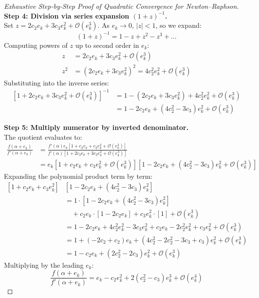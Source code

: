 \begin{proof}[Exhaustive Step-by-Step Proof of Quadratic Convergence for Newton--Raphson]
\noindent\textbf{Step 4: Division via series expansion $(1 + z)^{-1}$.} \\
Set $z = 2 c_2 e_k + 3 c_3 e_k^2 + \mathcal{O}(e_k^3)$. As $e_k \to 0$, $|z| < 1$, so we expand:
\begin{equation}
    (1 + z)^{-1} = 1 - z + z^2 - z^3 + \dots
\end{equation}
Computing powers of $z$ up to second order in $e_k$:
\begin{align}
    z &= 2 c_2 e_k + 3 c_3 e_k^2 + \mathcal{O}(e_k^3) \\
    z^2 &= \left( 2 c_2 e_k + 3 c_3 e_k^2 \right)^2 = 4 c_2^2 e_k^2 + \mathcal{O}(e_k^3)
\end{align}
Substituting into the inverse series:
\begin{align}
    \left[ 1 + 2 c_2 e_k + 3 c_3 e_k^2 + \mathcal{O}(e_k^3) \right]^{-1} &= 1 - \left( 2 c_2 e_k + 3 c_3 e_k^2 \right) + 4 c_2^2 e_k^2 + \mathcal{O}(e_k^3) \nonumber \\
    &= 1 - 2 c_2 e_k + (4 c_2^2 - 3 c_3) e_k^2 + \mathcal{O}(e_k^3)
\end{align}

\noindent\textbf{Step 5: Multiply numerator by inverted denominator.} \\
The quotient evaluates to:
\begin{align}
    \frac{f(\alpha + e_k)}{f'(\alpha + e_k)} &= \frac{f'(\alpha) e_k \left[ 1 + c_2 e_k + c_3 e_k^2 + \mathcal{O}(e_k^3) \right]}{f'(\alpha) \left[ 1 + 2 c_2 e_k + 3 c_3 e_k^2 + \mathcal{O}(e_k^3) \right]} \nonumber \\
    &= e_k \left[ 1 + c_2 e_k + c_3 e_k^2 + \mathcal{O}(e_k^3) \right] \left[ 1 - 2 c_2 e_k + (4 c_2^2 - 3 c_3) e_k^2 + \mathcal{O}(e_k^3) \right]
\end{align}
Expanding the polynomial product term by term:
\begin{align}
    \left[ 1 + c_2 e_k + c_3 e_k^2 \right] &\left[ 1 - 2 c_2 e_k + (4 c_2^2 - 3 c_3) e_k^2 \right] \nonumber \\
    &= 1 \cdot \left[ 1 - 2 c_2 e_k + (4 c_2^2 - 3 c_3) e_k^2 \right] \nonumber \\
    &\quad + c_2 e_k \cdot \left[ 1 - 2 c_2 e_k \right] + c_3 e_k^2 \cdot [1] + \mathcal{O}(e_k^3) \nonumber \\
    &= 1 - 2 c_2 e_k + 4 c_2^2 e_k^2 - 3 c_3 e_k^2 + c_2 e_k - 2 c_2^2 e_k^2 + c_3 e_k^2 + \mathcal{O}(e_k^3) \nonumber \\
    &= 1 + (-2 c_2 + c_2) e_k + (4 c_2^2 - 2 c_2^2 - 3 c_3 + c_3) e_k^2 + \mathcal{O}(e_k^3) \nonumber \\
    &= 1 - c_2 e_k + (2 c_2^2 - 2 c_3) e_k^2 + \mathcal{O}(e_k^3)
\end{align}
Multiplying by the leading $e_k$:
\begin{equation}
    \frac{f(\alpha + e_k)}{f'(\alpha + e_k)} = e_k - c_2 e_k^2 + 2(c_2^2 - c_3) e_k^3 + \mathcal{O}(e_k^4)
\end{equation}


\end{proof}
